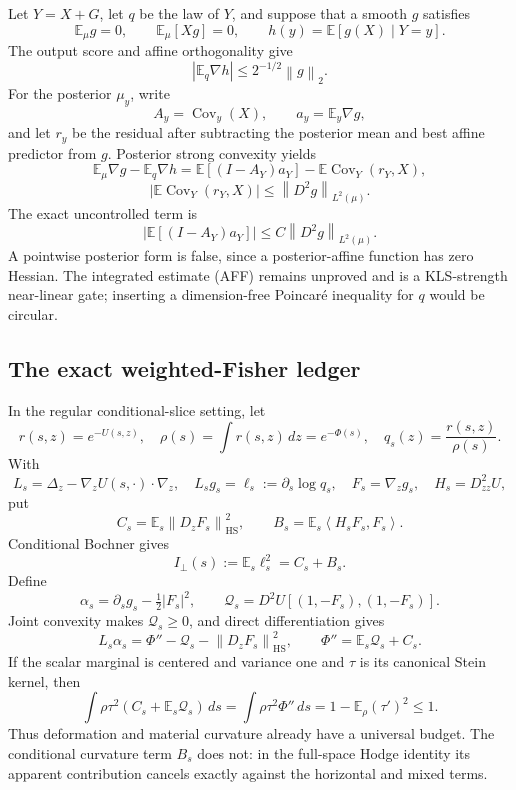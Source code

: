 \documentclass[11pt]{article}
\theoremstyle{definition}
\theoremstyle{remark}
\newcommand{\E}{\mathbb E}
\newcommand{\Cov}{\operatorname{Cov}}
\newcommand{\HS}{\mathrm{HS}}
\newcommand{\1}{\mathbf 1}
\newcommand{\ip}[2]{\left\langle #1,#2\right\rangle}
\newcommand{\norm}[1]{\left\lVert #1\right\rVert}
\begin{document}
Let \(Y=X+G\), let \(q\) be the law of \(Y\), and suppose that a smooth
\(g\) satisfies
\[
 \E_\mu g=0,\qquad \E_\mu[Xg]=0,\qquad
 h(y)=\E[g(X)\mid Y=y].
\]
The output score and affine orthogonality give
\[
                         |\E_q\nabla h|\le2^{-1/2}\norm g_2. \tag{10.10}
\]
For the posterior \(\mu_y\), write
\[
 A_y=\Cov_y(X),\qquad a_y=\E_y\nabla g,
\]
and let \(r_y\) be the residual after subtracting the posterior mean and
best affine predictor from \(g\).  Posterior strong convexity yields
\[
 \E_\mu\nabla g-\E_q\nabla h
 =\E[(I-A_Y)a_Y]-\E\Cov_Y(r_Y,X),                    \tag{10.11}
\]
\[
 \left|\E\Cov_Y(r_Y,X)\right|
 \le\norm{D^2g}_{L^2(\mu)}.                          \tag{10.12}
\]
The exact uncontrolled term is
\[
 \boxed{\qquad
 \left|\E[(I-A_Y)a_Y]\right|
 \le C\norm{D^2g}_{L^2(\mu)}.
 \qquad}                                              \tag{AFF}
\]
A pointwise posterior form is false, since a posterior-affine function has
zero Hessian.  The integrated estimate (AFF) remains unproved and is a
KLS-strength near-linear gate; inserting a dimension-free Poincar\'e
inequality for \(q\) would be circular.

\subsection{The exact weighted-Fisher ledger}

In the regular conditional-slice setting, let
\[
 r(s,z)=e^{-U(s,z)},\quad
 \rho(s)=\int r(s,z)\,dz=e^{-\Phi(s)},\quad
 q_s(z)=\frac{r(s,z)}{\rho(s)}.
\]
With
\[
 L_s=\Delta_z-\nabla_zU(s,\cdot)\cdot\nabla_z,\quad
 L_sg_s=\ell_s:=\partial_s\log q_s,\quad
 F_s=\nabla_zg_s,\quad H_s=D^2_{zz}U,
\]
put
\[
 C_s=\E_s\norm{D_zF_s}_{\HS}^2,\qquad
 B_s=\E_s\ip{H_sF_s}{F_s}.
\]
Conditional Bochner gives
\[
                         I_\perp(s):=\E_s\ell_s^2=C_s+B_s. \tag{10.13}
\]
Define
\[
 \alpha_s=\partial_sg_s-\tfrac12|F_s|^2,\qquad
 \mathcal Q_s=D^2U[(1,-F_s),(1,-F_s)].
\]
Joint convexity makes \(\mathcal Q_s\ge0\), and direct differentiation
gives
\[
 L_s\alpha_s=\Phi''-\mathcal Q_s-\norm{D_zF_s}_{\HS}^2,
 \qquad
 \Phi''=\E_s\mathcal Q_s+C_s.                        \tag{10.14}
\]
If the scalar marginal is centered and variance one and \(\tau\) is its
canonical Stein kernel, then
\[
 \boxed{\quad
 \int\rho\tau^2(C_s+\E_s\mathcal Q_s)\,ds
 =\int\rho\tau^2\Phi''\,ds
 =1-\E_\rho(\tau')^2\le1.
 \quad}                                               \tag{10.15}
\]
Thus deformation and material curvature already have a universal budget.
The conditional curvature term \(B_s\) does not: in the full-space Hodge
identity its apparent contribution cancels exactly against the horizontal
and mixed terms.
\end{document}
